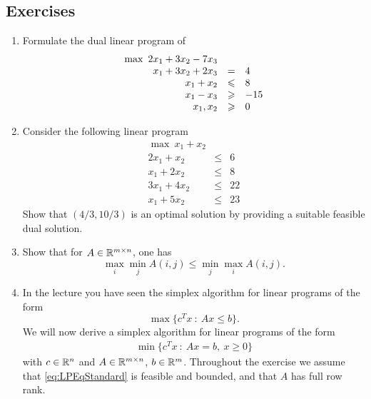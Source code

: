 \subsection*{Exercises}

\begin{enumerate}
\item Formulate the dual linear program of 
  \begin{displaymath}
    \begin{array}{r c l}
      \max \ 2 x_1 + 3 x_2 -7 x_3 & & \\
      x_1 + 3 x_2 + 2 x_3 & = & 4\\
      x_1 + x_2 & \leq & 8 \\
      x_1 - x_3 & \geq  &-15\\
      x_1,x_2 & \geq &0
    \end{array}
  \end{displaymath}
\item Consider the following linear program 
  \begin{displaymath}
    \begin{array}{rcl}
      \max \ x_1 + x_2 \\
      2 x_1 + x_2 & \leq  & 6 \\
      x_1 + 2x_2  & \leq & 8 \\
      3x_1 + 4x_2 & \leq & 22 \\
      x_1 + 5 x_2 & \leq & 23
    \end{array}   
  \end{displaymath}
  Show that $(4/3, 10/3)$ is an optimal solution by providing a
  suitable feasible dual solution. 

\item Show that for $A \in \setR^{m\times n}$, one has 
  \begin{displaymath}
    \max_i \min_j A(i,j) \leq \min_j \max_i A(i,j). 
  \end{displaymath}\label{d:item:2} 

\item  \label{d:item:3} 
 In the lecture you have seen the simplex algorithm for linear programs of the form 
 $$ \max \{ c^Tx~:~Ax\leq b\}. $$
 We will now derive a simplex algorithm for linear programs of the form
 \begin{align} \label{eq:LPEqStandard} \min \{ c^Tx~:~Ax = b,~x\geq 0\} \end{align}
with $c\in \R^n$ and $A\in \R^{m\times n}$, $b\in \R^m$.
Throughout the exercise we assume that \eqref{eq:LPEqStandard} is feasible and bounded, and that $A$ has full row rank.


\end{enumerate}
